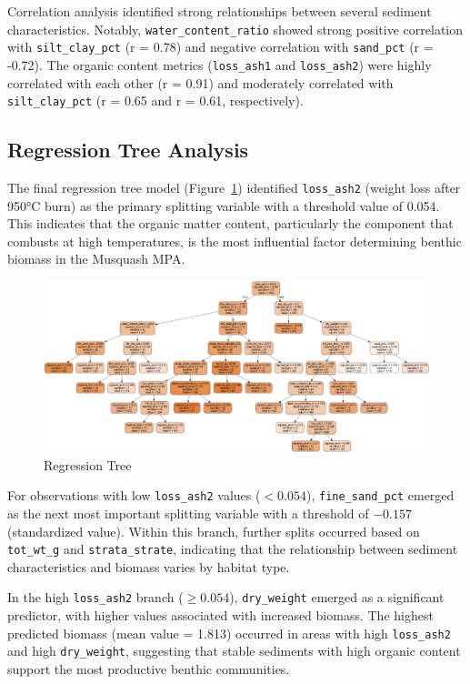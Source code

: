 \documentclass[12pt]{article}
\begin{document}
\qquad Correlation analysis identified strong relationships between several sediment characteristics. Notably, \texttt{water\_content\_ratio} showed strong positive correlation with \texttt{silt\_clay\_pct} (r = 0.78) and negative correlation with \texttt{sand\_pct} (r = -0.72). The organic content metrics (\texttt{loss\_ash1} and \texttt{loss\_ash2}) were highly correlated with each other (r = 0.91) and moderately correlated with \texttt{silt\_clay\_pct} (r = 0.65 and r = 0.61, respectively).

\subsection{Regression Tree Analysis}

The final regression tree model (Figure~\ref{fig:regression-tree}) identified \texttt{loss\_ash2} (weight loss after 950°C burn) as the primary splitting variable with a threshold value of 0.054. This indicates that the organic matter content, particularly the component that combusts at high temperatures, is the most influential factor determining benthic biomass in the Musquash MPA.

\begin{figure}[h!]
\centering
\includegraphics[scale=1]{Regression-tree}
\caption{Regression Tree}
\label{fig:regression-tree}
\end{figure}

\qquad For observations with low \texttt{loss\_ash2} values ($<0.054$), \texttt{fine\_sand\_pct} emerged as the next most important splitting variable with a threshold of $-0.157$ (standardized value). Within this branch, further splits occurred based on \texttt{tot\_wt\_g} and \texttt{strata\_strate}, indicating that the relationship between sediment characteristics and biomass varies by habitat type.

\qquad In the high \texttt{loss\_ash2} branch ($\geq0.054$), \texttt{dry\_weight} emerged as a significant predictor, with higher values associated with increased biomass. The highest predicted biomass (mean value = 1.813) occurred in areas with high \texttt{loss\_ash2} and high \texttt{dry\_weight}, suggesting that stable sediments with high organic content support the most productive benthic communities.
\end{document}
